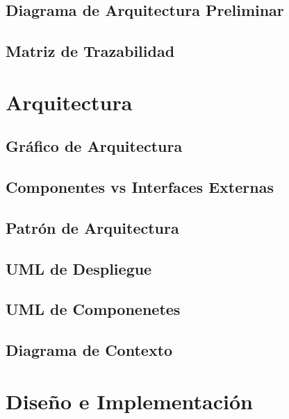 \documentclass[10pt]{article} %
\begin{document}
\subsection{Diagrama de Arquitectura Preliminar}

\subsection{Matriz de Trazabilidad}


\section{Arquitectura}

\subsection{Gráfico de Arquitectura}

\subsection{Componentes vs Interfaces Externas}

\subsection{Patrón de Arquitectura}

\subsection{UML de Despliegue}

\subsection{UML de Componenetes}

\subsection{Diagrama de Contexto}


\section{Diseño e Implementación}
\end{document}
